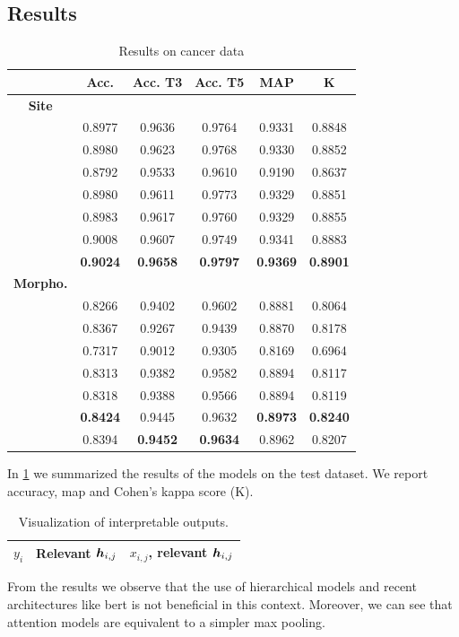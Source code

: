 \subsection{Results}

\begin{table}
  \centering
  \caption{Results on cancer data}
  \label{tab:results}
  \begin{tabular}{|c|c|c|c|c|c|}
    \hline
    &Acc.&Acc. T3&Acc. T5&MAP&K\\
    \hline
    \hline
    \textbf{Site}&&&&&\\
    \gru{}&0.8977&0.9636&0.9764&0.9331&0.8848\\
    \bert{}&0.8980&0.9623&0.9768&0.9330&0.8852\\
    \maxi{}&0.8792&0.9533&0.9610&0.9190&0.8637\\
    \maxh{}&0.8980&0.9611&0.9773&0.9329&0.8851\\
    \softmaxh{}&0.8983&0.9617&0.9760&0.9329&0.8855\\
    \softmax{}&0.9008&0.9607&0.9749&0.9341&0.8883\\
    \maxp{}&\textbf{0.9024}&\textbf{0.9658}&\textbf{0.9797}&\textbf{0.9369}&\textbf{0.8901}\\
    \hline
    \hline
    \textbf{Morpho.}&&&&&\\
    \gru{}&0.8266&0.9402&0.9602&0.8881&0.8064\\
    \bert{}&0.8367&0.9267&0.9439&0.8870&0.8178\\
    \maxi{}&0.7317&0.9012&0.9305&0.8169&0.6964\\
    \maxh{}&0.8313&0.9382&0.9582&0.8894&0.8117\\
    \softmaxh{}&0.8318&0.9388&0.9566&0.8894&0.8119\\
    \softmax{}&\textbf{0.8424}&0.9445&0.9632&\textbf{0.8973}&\textbf{0.8240}\\
    \maxp{}&0.8394&\textbf{0.9452}&\textbf{0.9634}&0.8962&0.8207\\
    \hline
  \end{tabular}
\end{table}
In \cref{tab:results} we summarized the results of the models on the test
dataset. We report accuracy, \ac{map} and Cohen's kappa score (K).

\begin{table}
  \centering
  \ttfamily
  \scriptsize
  \caption{Visualization of interpretable outputs.}
  \label{tab:multiAttention1}
  \begin{tabular}{|c|c|c|}
    \hline
    $y_i$&\textrm{Relevant} $\bm{h}_{i,j}$&$x_{i,j}$\textrm{, relevant} $\bm{h}_{i,j}$\\
    \hline
    
    \hline
    
    \hline
    
    \hline
  \end{tabular}
\end{table}
From the results we observe that the use of hierarchical models and
recent architectures like \ac{bert} is not beneficial in this
context. Moreover, we can see that attention models are equivalent to a
simpler max pooling.

